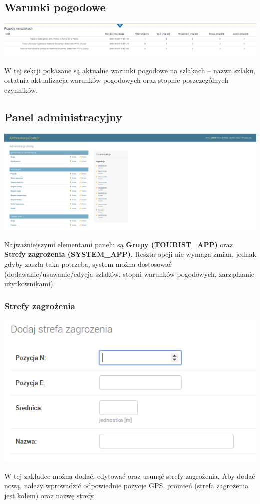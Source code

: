 \documentclass[a4paper,12pt]{article}
\begin{document}
\subsection{Warunki pogodowe}
\begin{center}
\includegraphics[scale=0.4]{ui4.png}
\end{center}
W tej sekcji pokazane są aktualne warunki pogodowe na szlakach -- nazwa szlaku, ostatnia aktualizacja warunków pogodowych oraz stopnie poszczególnych czynników.
\subsection{Panel administracyjny}
\begin{center}
\includegraphics[scale=0.4]{ui5.png}
\end{center}
Najważniejszymi elementami panelu są \textbf{Grupy (TOURIST\_APP)} oraz \textbf{Strefy zagrożenia (SYSTEM\_APP)}. Reszta opcji nie wymaga zmian, jednak gdyby zaszła taka potrzeba, system można dostosować (dodawanie/usuwanie/edycja szlaków, stopni warunków pogodowych, zarządzanie użytkownikami)
\subsubsection{Strefy zagrożenia}
\begin{center}
\includegraphics[scale=1]{ui6.png}
\end{center}
W tej zakładce można dodać, edytować oraz usunąć strefy zagrożenia. Aby dodać nową, należy wprowadzić odpowiednie pozycje GPS, promień (strefa zagrożenia jest kołem) oraz nazwę strefy
\end{document}
